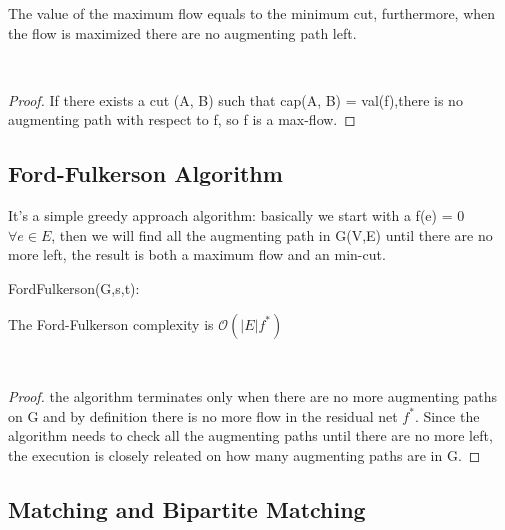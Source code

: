 \begin{claim}
    The value of the maximum flow equals to the minimum cut, furthermore, when the flow is maximized there are no augmenting path left.
\end{claim}\\

\begin{proof}
    If there exists a cut (A, B) such that cap(A, B) = val(f),there is no augmenting path with respect to f, so f is a max-flow.
\end{proof}

\subsection{Ford-Fulkerson Algorithm}
It's a simple greedy approach algorithm: basically we start with a f(e) = 0 $\forall e \in E$, then we will find all the augmenting path in G(V,E) until there are no more left, the result is both a maximum flow and an min-cut.\\

\begin{algorithm}[H]
    \SetAlgoLined
    \small

    \BlankLine


    \BlankLine

    \caption{FordFulkerson(G,s,t):}
\end{algorithm}

\begin{claim}
    The Ford-Fulkerson complexity is $\mathcal{O}(|E|f^{*})$
\end{claim}\\

\begin{proof}
    the algorithm terminates only when there are no more augmenting paths on G and by definition there is no more flow in the residual net $f^{*}$. Since the algorithm needs to check all the augmenting paths until there are no more left, the execution is closely releated on how many augmenting paths are in G.
\end{proof}

\subsection{Matching and Bipartite Matching}


